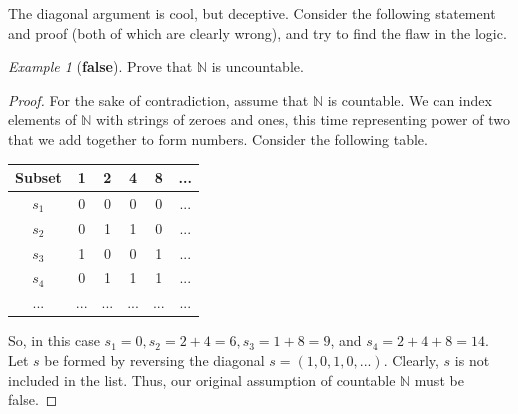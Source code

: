 \documentclass[11pt]{article}
\newcommand{\N}{\ensuremath{\mathbb N}}
\theoremstyle{plain}
\theoremstyle{definition}
\theoremstyle{remark}
\newtheorem{exm}{Example}[section]
\begin{document}
The diagonal argument is cool, but deceptive. Consider the following statement and proof (both of which are clearly wrong), and try to find the flaw in the logic.
\begin{exm}[{\bf false}]
    Prove that $\N$ is uncountable.
\end{exm}
\begin{proof}
    For the sake of contradiction, assume that $\N$ is countable. We can index elements of $\N$ with strings of zeroes and ones, this time representing power of two that we add together to form numbers. Consider the following table.
    \begin{center}
    \begin{tabular}{ |c|c c c c c| } 
         \hline
         Subset & 1 & 2 & 4 & 8 & ... \\ 
         \hline
         $s_1$ & 0 & 0 & 0 & 0 & ... \\ 
         $s_2$ & 0 & 1 & 1 & 0 & ... \\
         $s_3$ & 1 & 0 & 0 & 1 & ... \\
         $s_4$ & 0 & 1 & 1 & 1 & ... \\
         ... & ... & ... & ... & ... & ... \\
         \hline
    \end{tabular}
    \end{center}
    So, in this case $s_1 = 0, s_2 = 2 + 4 = 6, s_3 = 1 + 8 = 9$, and $s_4 = 2 + 4 + 8 = 14$. Let $s$ be formed by reversing the diagonal $s = (1, 0, 1, 0, ...)$. Clearly, $s$ is not included in the list. Thus, our original assumption of countable $\N$ must be false.
\end{proof}
\end{document}
